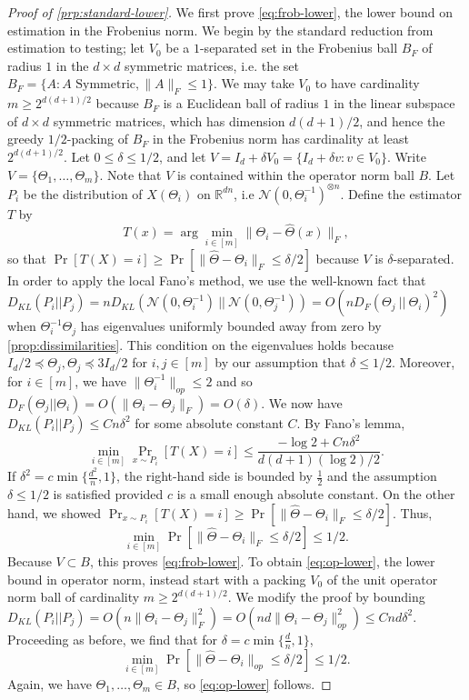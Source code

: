 \documentclass[aos]{imsart}
\theoremstyle{definition}
\numberwithin{equation}{section}
\newcommand{\R}{{\mathbb{R}}}
\newcommand{\htheta}{\widehat{\Theta}}
\newcommand{\ot}{\otimes}
\begin{document}
\begin{proof}[Proof of \cref{prp:standard-lower}]
We first prove \cref{eq:frob-lower}, the lower bound on estimation in the Frobenius norm. We begin by the standard reduction from estimation to testing; let $V_0$ be a $1$-separated set in the Frobenius ball $B_F$ of radius $1$ in the $d\times d$ symmetric matrices, i.e. the set $B_F = \{A: A \text{ Symmetric}, \|A\|_F \leq 1\}$. We may take $V_0$ to have cardinality $m \geq 2^{d(d+1)/2}$ because $B_F$ is a Euclidean ball of radius $1$ in the linear subspace of $d\times d$ symmetric matrices, which has dimension $d(d+1)/2$, and hence the greedy $1/2$-packing of $B_F$ in the Frobenius norm has cardinality at least $2^{d(d+1)/2}$. Let $0 \leq \delta \leq 1/2$, and let $V = I_d + \delta V_0 = \{I_d + \delta v: v \in V_0\}$. Write $V = \{\Theta_1, \dots, \Theta_m\}$. Note that $V$ is contained within the operator norm ball $B$.
Let $P_i$ be the distribution of $X(\Theta_i)$ on $\R^{dn}$, i.e $\mathcal{N}(0, \Theta^{-1}_i)^{\ot n}$. Define the estimator $T$ by 
$$T(x) = \arg\min_{i \in [m]} \|\Theta_i - \htheta(x)\|_F,$$
so that $\Pr[T(X) = i] \geq \Pr[\|\htheta -  \Theta_i\|_F \leq \delta/2]$ because $V$ is $\delta$-separated. In order to apply the local Fano's method, we use the well-known fact that $D_{KL}(P_i|| P_j) = n D_{KL}(\mathcal{N}(0, \Theta_i^{-1})\ || \ \mathcal{N}(0, \Theta_j^{-1})) = O(nD_{F}(\Theta_j \ || \ \Theta_i)^2)$ when $\Theta_i^{-1}\Theta_j$ has eigenvalues uniformly bounded away from zero by \cref{prop:dissimilarities}. This condition on the eigenvalues holds because $I_d/2 \preceq \Theta_j, \Theta_j \preceq 3I_d/2$ for $i,j \in [m]$ by our assumption that $\delta \leq 1/2$. Moreover, for $i \in [m]$, we have $\|\Theta_i^{-1}\|_{op} \leq 2$ and so $D_F(\Theta_j|| \Theta_i) = O( \|\Theta_i - \Theta_j\|_F) = O(\delta).$ We now have $D_{KL}(P_i|| P_j) \leq Cn \delta^2$ for some absolute constant $C$. By Fano's lemma, 
 $$\min_{i \in [m]} \Pr_{x \sim P_i}[T(X) =  i] \leq \frac{ - \log 2 + C n \delta^2}{d(d+1)(\log 2)/2 }.$$
If $\delta^2 = c\min\{ \frac{d^2}{n}, 1\}$, the right-hand side is bounded by $\frac{1}{2}$ and the assumption $\delta \leq 1/2$ is satisfied provided $c$ is a small enough absolute constant. On the other hand, we showed $\Pr_{x \sim P_i}[T(X) =  i] \geq \Pr[\|\htheta -  \Theta_i\|_F \leq \delta/2]$. Thus, 
$$\min_{i \in [m]} \Pr[ \|\htheta - \Theta_i\|_F \leq \delta/2] \leq 1/2.$$
Because $V \subset B$, this proves \cref{eq:frob-lower}. 
To obtain \cref{eq:op-lower}, the lower bound in operator norm, instead start with a packing $V_0$ of the unit operator norm ball of cardinality $m \geq 2^{d(d+1)/2}$. We modify the proof by bounding $D_{KL}(P_i || P_j) = O(n \| \Theta_i - \Theta_j\|_F^2) = O(n d \|\Theta_i - \Theta_j\|_{op}^2) \leq C nd \delta^2.$ Proceeding as before, we find that for $\delta = c \min \{\frac{d}{n}, 1\}$, 
$$\min_{i \in [m]} \Pr[ \|\htheta - \Theta_i\|_{op} \leq \delta/2] \leq 1/2.$$
Again, we have $\Theta_1, \dots, \Theta_m \in B$, so \cref{eq:op-lower} follows. \end{proof}
\end{document}

